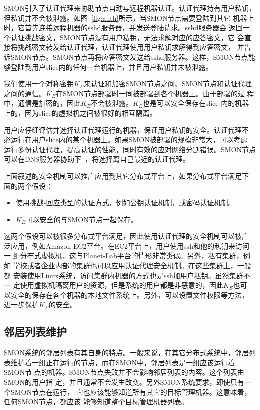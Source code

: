 SMON引入了认证代理来协助节点自动与远程机器认证。认证代理持有用户私钥，
但私钥并不会被泄露。如图~\ref{fig:auth}所示，当SMON节点需要登陆到其它
机器上时，它首先连接远程机器的sshd服务器，并发送登陆请求。sshd服务器会
返回一个认证挑战密文，SMON节点没有用户私钥，无法求解对应的应答密文，它
会直接将挑战密文转发给认证代理，认证代理使用用户私钥求解得到应答密文，
并告诉SMON节点。SMON节点再将应答密文发送给sshd服务器。这样，SMON节点能
够登陆到用户slice内的任何一台机器上，并且用户私钥并未被泄露。

我们使用一个对称密钥$K_E$来认证和加密SMON节点之间、SMON节点和认证代理
之间的通信。$K_E$在SMON节点部署时一同被部署到各个机器上。由于部署的过
程中，通信是加密的，因此$K_E$不会被泄露。$K_E$也是可以安全保存在slice
内的机器上的，因为slice的虚拟机之间被很好的相互隔离。

用户应仔细评估并选择认证代理运行的机器，保证用户私钥的安全。认证代理不
必运行在用户slice内的某个机器上。如果SMON被部署的规模非常大，可以考虑
运行多份认证代理，提高认证的性能，同时有效的应对网络分割错误。SMON节点
可以在DNS服务器协助下~\cite{dns_akamai}，将选择离自己最近的认证代理。

上面叙述的安全机制可以推广应用到其它分布式平台上，如果分布式平台满足下
面的两个假设：

\begin{itemize}
  \item 使用挑战-回应类型的认证方式，例如公钥认证机制，或密码认证机制。
  
  \item $K_E$可以安全的与SMON节点一起保存。
\end{itemize}

这两个假设可以被很多分布式平台满足，因此使用认证代理的安全机制可以被广
泛应用，例如Amazon EC2平台。在EC2平台上，用户使用ssh和他的私钥来访问一
组分布式虚拟机，这与Planet-Lab平台的情形非常类似。另外，私有集群，例如
学校或者企业内部的集群也可以应用认证代理安全机制。在这些集群上，一般都
安装使用Linux系统，访问集群内机器的方式也是ssh加用户私钥。虽然集群不一
定使用虚拟机隔离用户的资源，但是系统的用户都是非恶意的，因此$K_E$也可
以安全的保存在各个机器的本地文件系统上。另外，可以设置文件权限等方法，
进一步保护$K_E$的安全。

\subsection{邻居列表维护}

SMON系统的邻居列表有其自身的特点。一般来说，在其它分布式系统中，邻居列
表维护着一组正在运行的节点，而在SMON中，邻居列表是一组应该运行着SMON节
点的机器。SMON节点失败并不会影响邻居列表的内容。这个列表由SMON的用户指
定，并且通常不会发生改变。另外SMON系统要求，即使只有一个SMON节点在运行，
它也应该能够知道所有其它的目标管理机器。这意味着，任何SMON节点，都应该
能够知道整个目标管理机器列表。

